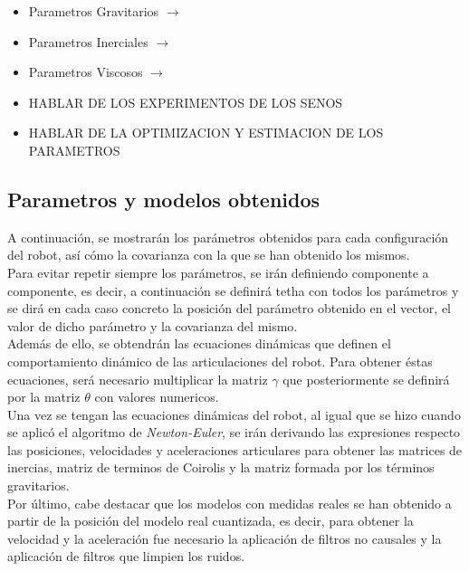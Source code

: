 	\begin{itemize}
		\item Parametros Gravitarios $ \rightarrow $
		\item Parametros Inerciales $ \rightarrow $
		\item Parametros Viscosos $ \rightarrow $

	\end{itemize}







	\begin{itemize}

		\item HABLAR DE LOS EXPERIMENTOS DE LOS SENOS
		\item HABLAR DE LA OPTIMIZACION Y ESTIMACION DE LOS PARAMETROS
	\end{itemize}


	\subsection{Parametros y modelos obtenidos}
	A continuación, se mostrarán los parámetros obtenidos para cada configuración del robot, así cómo la covarianza con la que se han obtenido los mismos.\\
	Para evitar repetir siempre los parámetros, se irán definiendo componente a componente, es decir, a continuación se definirá tetha con todos los parámetros y se dirá en cada caso concreto la posición del parámetro obtenido en el vector, el valor de dicho parámetro y la covarianza del mismo. \\

	Además de ello, se obtendrán las ecuaciones dinámicas que definen el comportamiento dinámico de las articulaciones del robot. Para obtener éstas ecuaciones, será necesario multiplicar la matriz $\gamma$ que posteriormente se definirá por la matriz $\theta$ con valores numericos. \\
	Una vez se tengan las ecuaciones dinámicas del robot, al igual que se hizo cuando se aplicó el algoritmo de \textit{Newton-Euler}, se irán derivando las expresiones respecto las posiciones, velocidades y aceleraciones articulares para obtener las matrices de inercias, matriz de terminos de Coirolis y la matriz formada por los términos gravitarios.\\

	Por último, cabe destacar que los modelos con medidas reales se han obtenido a partir de la posición del modelo real cuantizada, es decir, para obtener la velocidad y la aceleración fue necesario la aplicación de filtros no causales y la aplicación de filtros que limpien los ruidos.


